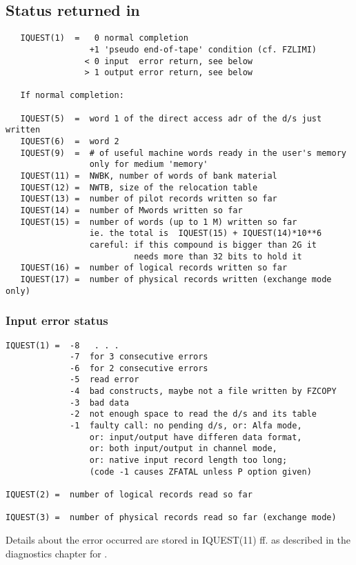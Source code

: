 \subsection*{Status returned in }
\begin{verbatim}
   IQUEST(1)  =   0 normal completion
                 +1 'pseudo end-of-tape' condition (cf. FZLIMI)
                < 0 input  error return, see below
                > 1 output error return, see below

   If normal completion:

   IQUEST(5)  =  word 1 of the direct access adr of the d/s just written
   IQUEST(6)  =  word 2
   IQUEST(9)  =  # of useful machine words ready in the user's memory
                 only for medium 'memory'
   IQUEST(11) =  NWBK, number of words of bank material
   IQUEST(12) =  NWTB, size of the relocation table
   IQUEST(13) =  number of pilot records written so far
   IQUEST(14) =  number of Mwords written so far
   IQUEST(15) =  number of words (up to 1 M) written so far
                 ie. the total is  IQUEST(15) + IQUEST(14)*10**6
                 careful: if this compound is bigger than 2G it
                          needs more than 32 bits to hold it
   IQUEST(16) =  number of logical records written so far
   IQUEST(17) =  number of physical records written (exchange mode only)
\end{verbatim}

\subsubsection*{Input error status}

\begin{verbatim}
IQUEST(1) =  -8   . . .
             -7  for 3 consecutive errors
             -6  for 2 consecutive errors
             -5  read error
             -4  bad constructs, maybe not a file written by FZCOPY
             -3  bad data
             -2  not enough space to read the d/s and its table
             -1  faulty call: no pending d/s, or: Alfa mode,
                 or: input/output have differen data format,
                 or: both input/output in channel mode,
                 or: native input record length too long;
                 (code -1 causes ZFATAL unless P option given)

IQUEST(2) =  number of logical records read so far

IQUEST(3) =  number of physical records read so far (exchange mode)
\end{verbatim}
Details about the error occurred are stored in IQUEST(11) ff.
as described in the diagnostics chapter for .

